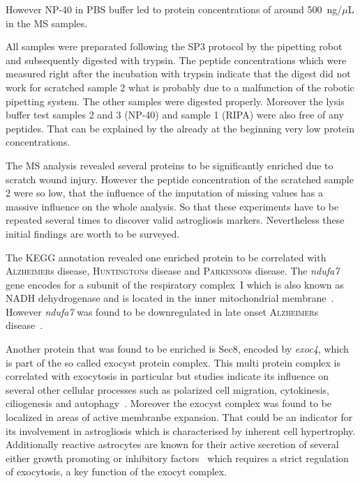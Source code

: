 \documentclass[a4paper,11pt,bibtotocnumbered]{article}
\begin{document}

However NP-40 in PBS buffer led to protein concentrations of around 500~ng/$\mu$L in the MS samples. 

All samples were preparated following the SP3 protocol by the pipetting robot and subsequently digested with trypsin. The peptide concentrations which were measured right after the incubation with trypsin indicate that the digest did not work for scratched sample 2 what is probably due to a malfunction of the robotic pipetting system. The other samples were digested properly. Moreover the lysis buffer test samples 2 and 3 (NP-40) and sample 1 (RIPA) were also free of any peptides. That can be explained by the already at the beginning very low protein concentrations.        

The MS analysis revealed several proteins to be significantly enriched due to scratch wound injury. However the peptide concentration of the scratched sample 2 were so low, that the influence of the imputation of missing values has a massive influence on the whole analysis. So that these experiments have to be repeated several times to discover valid astrogliosis markers. Nevertheless these initial findings are worth to be surveyed.

The KEGG annotation revealed one enriched protein to be correlated with \textsc{Alzheimer}s disease, \textsc{Huntington}s disease and \textsc{Parkinson}s disease. The \textit{ndufa7} gene encodes for a subunit of the respiratory complex~I which is also known as NADH dehydrogenase and is located in the inner mitochondrial membrane~\cite{Stryer2015, Signes2018}. However \textit{ndufa7} was found to be downregulated in late onset \textsc{Alzheimer}s disease~\cite{Adav2019}.
  
Another protein that was found to be enriched is Sec8, encoded by \textit{exoc4}, which is part of the so called exocyst protein complex. This multi protein complex is correlated with exocytosis in particular but studies indicate its influence on     several other cellular processes such as polarized cell migration, cytokinesis, ciliogenesis and autophagy~\cite{Wu2015, Letinica2009}.
Moreover the exocyst complex was found to be localized in areas of active membranbe expansion. That could be an indicator for its involvement in astrogliosis which is characterised by inherent cell hypertrophy. Additionally reactive astrocytes are known for their active secretion of several either growth promoting or inhibitory factors~\cite{Zamanian2012, Karimi-Abdolrezaee2012} which requires a strict regulation of exocytosis, a key function of the exocyt complex.
\end{document}
